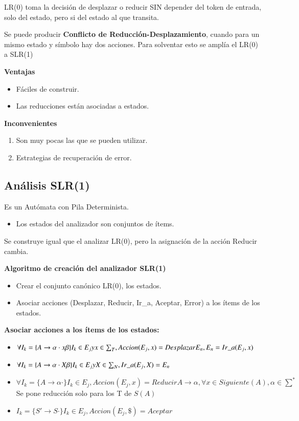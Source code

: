\documentclass[12pt]{report} %
\begin{document}
LR(0) toma la decisión de desplazar o reducir SIN depender del token de entrada, solo del estado, pero si del estado al que transita.

Se puede producir \textbf{Conflicto de Reducción-Desplazamiento}, cuando para un mismo estado y símbolo hay dos acciones.
Para solventar esto se amplía el LR(0) a SLR(1)

\textbf{Ventajas}
\begin{itemize}
  \item Fáciles de construir.
  \item Las reducciones están asociadas a estados.
\end{itemize}

\textbf{Inconvenientes}
\begin{enumerate}
  \item Son muy pocas las que se pueden utilizar.
  \item Estrategias de recuperación de error.
\end{enumerate}

\subsection{Análisis SLR(1)}
Es un Autómata con Pila Determinista.
\begin{itemize}
  \item Los estados del analizador son conjuntos de ítems.
\end{itemize}

Se construye igual que el analizar LR(0), pero la asignación de la acción Reducir cambia.

\textbf{Algoritmo de creación del analizador SLR(1)}
\begin{itemize}
  \item Crear el conjunto canónico LR(0), los estados.
  \item Asociar acciones (Desplazar, Reducir, Ir\_a, Aceptar, Error) a los ítems de los estados.
\end{itemize}

\textbf{Asociar acciones a los ítems de los estados:}
\begin{itemize}
  \item $\forall I_k = \{ A \rightarrow \alpha \cdot x \beta\} I_k \in E_j \space y \space x\in \sum_T, Accion(E_j, x)=Desplazar E_n, E_n = Ir\_a(E_j,x)$
  \item $\forall I_k = \{ A \rightarrow \alpha \cdot X \beta\} I_k \in E_j \space y \space X\in \sum_N, Ir\_a(E_j,X) = E_n$
  \item $\forall I_k = \{ A \rightarrow \alpha \cdot \} I_k \in E_j, Accion(E_j, x)= Reducir A \rightarrow \alpha, \forall x \in Siguiente(A), \alpha \in \sum ^*$ Se pone reducción solo para los T de $S(A)$
  \item $I_k = \{ S' \rightarrow S \cdot \} I_k \in E_j, Accion(E_j, \$)= Aceptar$
\end{itemize}
\end{document}
